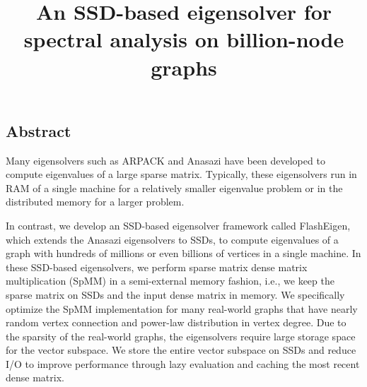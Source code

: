 \documentclass[letterpaper,twocolumn,10pt]{article}
\begin{document}
\date{}

\title{An SSD-based eigensolver for spectral analysis on billion-node graphs}


\maketitle

\thispagestyle{empty}


\subsection*{Abstract}
Many eigensolvers such as ARPACK and Anasazi have been developed to
compute eigenvalues of a large sparse matrix. Typically, these
eigensolvers run in RAM of a single machine for a relatively smaller
eigenvalue problem or in the distributed memory for a larger problem.

In contrast, we develop an SSD-based eigensolver framework called
FlashEigen, which extends the Anasazi eigensolvers to SSDs, to compute
eigenvalues of a graph with hundreds of millions or even billions of
vertices in a single machine. In these SSD-based eigensolvers, we
perform sparse matrix dense matrix multiplication (SpMM) in a
semi-external memory fashion, i.e., we keep the sparse matrix on SSDs
and the input dense matrix in memory. We specifically optimize the
SpMM implementation for many real-world graphs that have nearly random
vertex connection and power-law distribution in vertex degree. Due to
the sparsity of the real-world graphs, the eigensolvers require large
storage space for the vector subspace. We store the entire
vector subspace on SSDs and reduce I/O to improve performance through
lazy evaluation and caching the most recent dense matrix.
\end{document}
